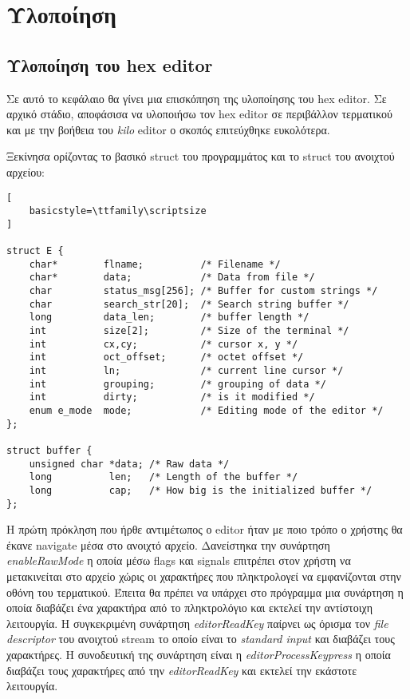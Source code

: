\section{Υλοποίηση}
\subsection{Υλοποίηση του hex editor}
Σε αυτό το κεφάλαιο θα γίνει μια επισκόπηση της υλοποίησης του hex editor.
Σε αρχικό στάδιο, αποφάσισα να υλοποιήσω τον hex editor σε περιβάλλον τερματικού και με την βοήθεια του \emph{kilo} editor ο σκοπός επιτεύχθηκε ευκολότερα.

Ξεκίνησα ορίζοντας το βασικό struct του προγραμμάτος και το struct του ανοιχτού αρχείου:


\begin{lstlisting}[
    basicstyle=\ttfamily\scriptsize
]

struct E {
	char*        flname;          /* Filename */
	char*        data;            /* Data from file */
	char         status_msg[256]; /* Buffer for custom strings */
	char         search_str[20];  /* Search string buffer */
	long         data_len;        /* buffer length */
	int          size[2];         /* Size of the terminal */
	int          cx,cy;           /* cursor x, y */
	int          oct_offset;      /* octet offset */
	int          ln;              /* current line cursor */
	int          grouping;        /* grouping of data */
	int          dirty;           /* is it modified */
	enum e_mode  mode;            /* Editing mode of the editor */
};

struct buffer {
	unsigned char *data; /* Raw data */
	long          len;   /* Length of the buffer */
	long          cap;   /* How big is the initialized buffer */
};
\end{lstlisting}

Η πρώτη πρόκληση που ήρθε αντιμέτωπος ο editor ήταν με ποιο τρόπο ο χρήστης θα έκανε navigate μέσα στο ανοιχτό αρχείο.
Δανείστηκα την συνάρτηση \emph{enableRawMode} η οποία μέσω flags και signals επιτρέπει στον χρήστη να μετακινείται στο αρχείο χώρις οι χαρακτήρες που πληκτρολογεί να εμφανίζονται στην οθόνη του τερματικού.
Έπειτα θα πρέπει να υπάρχει στο πρόγραμμα μια συνάρτηση η οποία διαβάζει ένα χαρακτήρα από το πληκτρολόγιο και εκτελεί την αντίστοιχη λειτουργία.
Η συγκεκριμένη συνάρτηση \emph{editorReadKey} παίρνει ως όρισμα τον \emph{file descriptor} του ανοιχτού stream το οποίο είναι το \emph{standard input} και διαβάζει τους χαρακτήρες.
H συνοδευτική της συνάρτηση είναι η \emph{editorProcessKeypress} η οποία διαβάζει τους χαρακτήρες από την \emph{editorReadKey} και εκτελεί την εκάστοτε λειτουργία.


